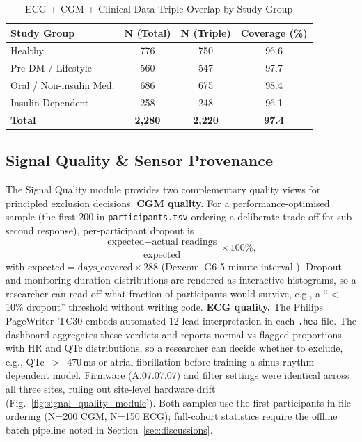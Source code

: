\documentclass[conference]{IEEEtran}
\begin{document}
\begin{table}[htbp]
    \centering
    \caption{ECG + CGM + Clinical Data Triple Overlap by Study Group}
    \label{tab:triple_overlap}
    \begin{tabular}{@{} l c c c @{}}
        \hline
        \textbf{Study Group} & \textbf{N (Total)} & \textbf{N (Triple)} & \textbf{Coverage (\%)} \\
        \hline
        Healthy                 & 776   & 750   & 96.6 \\
        Pre-DM / Lifestyle      & 560   & 547   & 97.7 \\
        Oral / Non-insulin Med. & 686   & 675   & 98.4 \\
        Insulin Dependent       & 258   & 248   & 96.1 \\
        \hline
        \textbf{Total}          & \textbf{2,280} & \textbf{2,220} & \textbf{97.4} \\
        \hline
    \end{tabular}
\end{table}

\subsection{Signal Quality \& Sensor Provenance}
The Signal Quality module provides two complementary quality views for principled exclusion decisions. \textbf{CGM quality.} For a performance-optimised sample (the first 200 in \texttt{participants.tsv} ordering a deliberate trade-off for sub-second response), per-participant dropout is
\begin{equation}
    \frac{\text{expected} - \text{actual readings}}{\text{expected}} \times 100\%,
\end{equation}
with $\text{expected} = \text{days\_covered} \times 288$ (Dexcom~G6 5-minute interval \cite{dexcom_guides}). Dropout and monitoring-duration distributions are rendered as interactive histograms, so a researcher can read off what fraction of participants would survive, e.g., a ``$<$10\% dropout'' threshold without writing code. \textbf{ECG quality.} The Philips PageWriter~TC30 \cite{philips_tc30_manual} embeds automated 12-lead interpretation in each \texttt{.hea} file. The dashboard aggregates these verdicts and reports normal-vs-flagged proportions with HR and QTc distributions, so a researcher can decide whether to exclude, e.g., QTc~$>$~470\,ms or atrial fibrillation before training a sinus-rhythm-dependent model. Firmware (A.07.07.07) and filter settings were identical across all three sites, ruling out site-level hardware drift (Fig.~\ref{fig:signal_quality_module}). Both samples use the first participants in file ordering (N=200 CGM, N=150 ECG); full-cohort statistics require the offline batch pipeline noted in Section~\ref{sec:discussions}.
\end{document}
